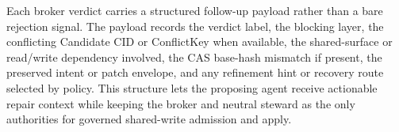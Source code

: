 \documentclass[9pt,letterpaper]{extarticle}
\begin{document}
Each broker verdict carries a structured follow-up payload rather than a bare rejection signal. The payload records the verdict label, the blocking layer, the conflicting Candidate CID or ConflictKey when available, the shared-surface or read/write dependency involved, the CAS base-hash mismatch if present, the preserved intent or patch envelope, and any refinement hint or recovery route selected by policy. This structure lets the proposing agent receive actionable repair context while keeping the broker and neutral steward as the only authorities for governed shared-write admission and apply.

\begin{figure}[H]



















































\end{figure}
\end{document}
